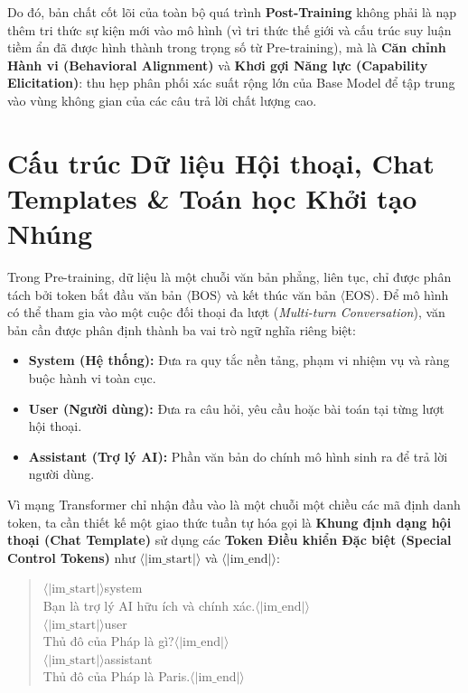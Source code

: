Do đó, bản chất cốt lõi của toàn bộ quá trình \textbf{Post-Training} không phải là nạp thêm tri thức sự kiện mới vào mô hình (vì tri thức thế giới và cấu trúc suy luận tiềm ẩn đã được hình thành trong trọng số từ Pre-training), mà là \textbf{Căn chỉnh Hành vi (Behavioral Alignment)} và \textbf{Khơi gợi Năng lực (Capability Elicitation)}: thu hẹp phân phối xác suất rộng lớn của Base Model để tập trung vào vùng không gian của các câu trả lời chất lượng cao.

\section{Cấu trúc Dữ liệu Hội thoại, Chat Templates \& Toán học Khởi tạo Nhúng}
\label{sec:chat_templates_embedding}

Trong Pre-training, dữ liệu là một chuỗi văn bản phẳng, liên tục, chỉ được phân tách bởi token bắt đầu văn bản $\langle\text{BOS}\rangle$ và kết thúc văn bản $\langle\text{EOS}\rangle$. Để mô hình có thể tham gia vào một cuộc đối thoại đa lượt (\textit{Multi-turn Conversation}), văn bản cần được phân định thành ba vai trò ngữ nghĩa riêng biệt:
\begin{itemize}[leftmargin=1.2cm]
    \item \textbf{System (Hệ thống):} Đưa ra quy tắc nền tảng, phạm vi nhiệm vụ và ràng buộc hành vi toàn cục.
    \item \textbf{User (Người dùng):} Đưa ra câu hỏi, yêu cầu hoặc bài toán tại từng lượt hội thoại.
    \item \textbf{Assistant (Trợ lý AI):} Phần văn bản do chính mô hình sinh ra để trả lời người dùng.
\end{itemize}

Vì mạng Transformer chỉ nhận đầu vào là một chuỗi một chiều các mã định danh token, ta cần thiết kế một giao thức tuần tự hóa gọi là \textbf{Khung định dạng hội thoại (Chat Template)} sử dụng các \textbf{Token Điều khiển Đặc biệt (Special Control Tokens)} như $\langle|\text{im\_start}|\rangle$ và $\langle|\text{im\_end}|\rangle$:
\begin{quote}
\ttfamily
$\langle|\text{im\_start}|\rangle$system\\
Bạn là trợ lý AI hữu ích và chính xác.$\langle|\text{im\_end}|\rangle$\\
$\langle|\text{im\_start}|\rangle$user\\
Thủ đô của Pháp là gì?$\langle|\text{im\_end}|\rangle$\\
$\langle|\text{im\_start}|\rangle$assistant\\
Thủ đô của Pháp là Paris.$\langle|\text{im\_end}|\rangle$
\end{quote}

